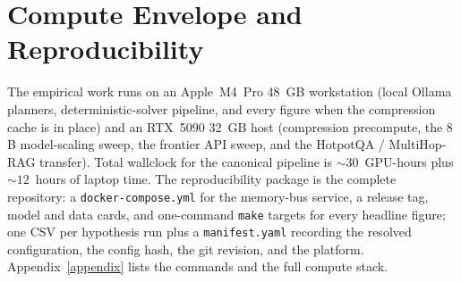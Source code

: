 \section{Compute Envelope and Reproducibility}
\label{sec:envelope}

The empirical work runs on an Apple~M4~Pro 48~GB workstation (local
Ollama planners, deterministic-solver pipeline, and every figure when
the compression cache is in place) and an RTX~5090 32~GB host
(compression precompute, the $8$B model-scaling sweep, the frontier
API sweep, and the HotpotQA / MultiHop-RAG transfer). Total wallclock
for the canonical pipeline is $\sim 30$~GPU-hours plus $\sim 12$~hours
of laptop time. The reproducibility package is the complete
repository: a \texttt{docker-compose.yml} for the memory-bus
service, a release tag, model and data cards, and one-command
\texttt{make} targets for every headline figure; one CSV per
hypothesis run plus a \texttt{manifest.yaml} recording the resolved
configuration, the config hash, the git revision, and the platform.
Appendix~\ref{appendix} lists the commands and the full compute stack.
